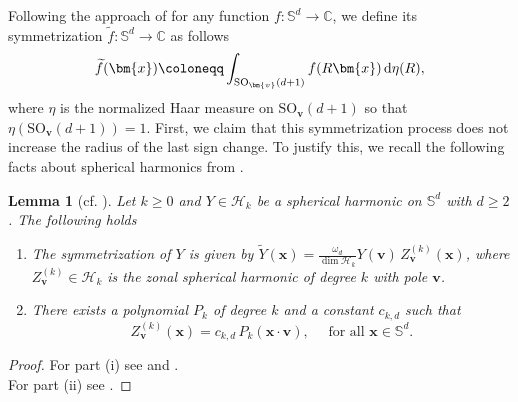 \documentclass[reqno, a4paper]{amsart}
\def\C{\mathbb{C}}
\renewcommand{\d}{\text{\rm d}}
\newcommand{\Sd}{\mathbb{S}^d}
\newcommand{\x}{{\bm x}}
\renewcommand{\v}{{\bm v}}
\newcommand{\wt}{\widetilde}
\theoremstyle{plain}
\newtheorem{lemma}[theorem]{Lemma}
\theoremstyle{definition}
\theoremstyle{remarkstyle}
\numberwithin{equation}{section}
\begin{document}
Following the approach of \cite{LiTrigonometricExtremalFunctionsErdosTuran1999} for any function $f:\Sd\to \C$, we define its symmetrization $\widetilde{f}:\Sd\to \C$ as follows
\begin{equation*}
    \widetilde{f}(\bm{x})\coloneqq \int_{\mathrm{SO}_{\bm{v}}(d+1)} f(R\bm{x})\, \d\eta(R),
\end{equation*}
where $\eta$ is the normalized Haar measure on $\mathrm{SO}_{\bm{v}}(d+1)$ so that $\eta(\mathrm{SO}_{\bm{v}}(d+1))=1$. 
First, we claim that this symmetrization process does not increase the radius of the last sign change. 
To justify this, we recall the following facts about spherical harmonics from \cite[Chapter IV]{SteinWeissFourierAnalysis}.
\begin{lemma}[cf. {\cite{SteinWeissFourierAnalysis}}]\label{lem:facts-about-zonal-spherical-harmonics}
    Let $k\geq 0$ and $Y \in \mathscr{H}_k$ be a spherical harmonic on $\Sd$ with $d\geq 2$. The following holds
    \begin{enumerate}[label=\textnormal{(\roman*)}]
        \item The symmetrization of $Y$ is given by $\wt Y(\x)=\frac{\omega_d}{\dim{\mathscr{H}_k}}Y(\v) \,Z_{\v}^{(k)}(\x)$, where $Z^{(k)}_{\v}\in \mathscr{H}_k$ is the zonal spherical harmonic of degree $k$ with pole $\v$.
        \item There exists a polynomial $P_k$ of degree $k$ and a constant $c_{k, d}$ such that
        \begin{equation*}
            Z^{(k)}_{\v}(\x)=c_{k, d}\, P_k(\x\cdot \v), \quad \text{ for all } \x\in\Sd.
        \end{equation*}
    \end{enumerate}
\end{lemma}
\begin{proof}
    For part (i) see \cite[Ch IV, Theorem 2.12]{SteinWeissFourierAnalysis} and \cite[Ch IV, Corollary 2.9]{SteinWeissFourierAnalysis}. \\
    For part (ii) see \cite[Ch IV, Theorem 2.14]{SteinWeissFourierAnalysis}.
\end{proof}
\end{document}
